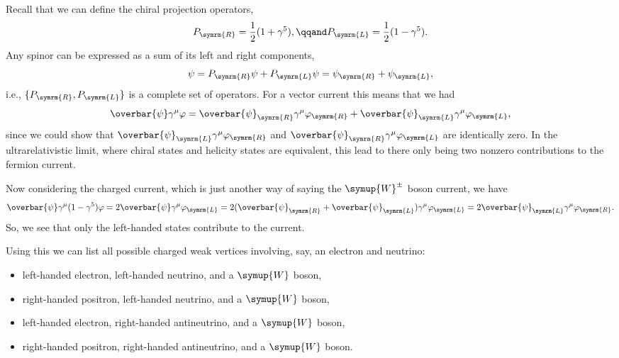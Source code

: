 \documentclass[fleqn]{NotesClass}
\newcommand{\Pparticle}[1]{\symup{#1}}
\newcommand{\PW}{\ensuremath{\Pparticle{W}}}
\newcommand{\PWpm}{\ensuremath{\Pparticle{W}^{\pm}}}
\newcommand{\diracadjoint}[1]{\overbar{#1}}
\newcommand{\Left}{\symrm{L}}
\newcommand{\Right}{\symrm{R}}
\begin{document}
    Recall that we can define the chiral projection operators,
    \begin{equation}
        P_{\Right} = \frac{1}{2}(1 + \gamma^5), \qqand P_{\Left} = \frac{1}{2}(1 - \gamma^5).
    \end{equation}
    Any spinor can be expressed as a sum of its left and right components,
    \begin{equation}
        \psi = P_{\Right}\psi + P_{\Left}\psi = \psi_{\Right} + \psi_{\Left},
    \end{equation}
    i.e., \(\{P_{\Right}, P_{\Left}\}\) is a complete set of operators.
    For a vector current this means that we had
    \begin{equation}
        \diracadjoint{\psi}\gamma^\mu \varphi = \diracadjoint{\psi}_{\Right}\gamma^\mu \varphi_{\Right} + \diracadjoint{\psi}_{\Left}\gamma^\mu \varphi_{\Left},
    \end{equation}
    since we could show that \(\diracadjoint{\psi}_{\Left}\gamma^\mu\varphi_{\Right}\) and \(\diracadjoint{\psi}_{\Right}\gamma^\mu\varphi_{\Left}\) are identically zero.
    In the ultrarelativistic limit, where chiral states and helicity states are equivalent, this lead to there only being two nonzero contributions to the fermion current.
    
    Now considering the charged current, which is just another way of saying the \PWpm{} boson current, we have
    \begin{equation}
        \diracadjoint{\psi} \gamma^\mu (1 - \gamma^5) \varphi = 2\diracadjoint{\psi}\gamma^\mu \varphi_{\Left} = 2(\diracadjoint{\psi}_{\Right} + \diracadjoint{\psi}_{\Left})\gamma^\mu\varphi_{\Left} = 2\diracadjoint{\psi}_{\Left} \gamma^\mu \varphi_{\Right}.
    \end{equation}
    So, we see that only the left-handed states contribute to the current.
    
    Using this we can list all possible charged weak vertices involving, say, an electron and neutrino:
    \begin{itemize}
        \item left-handed electron, left-handed neutrino, and a \PW{} boson,
        \item right-handed positron, left-handed neutrino, and a \PW{} boson,
        \item left-handed electron, right-handed antineutrino, and a \PW{} boson,
        \item right-handed positron, right-handed antineutrino, and a \PW{} boson.
    \end{itemize}
    
\end{document}
